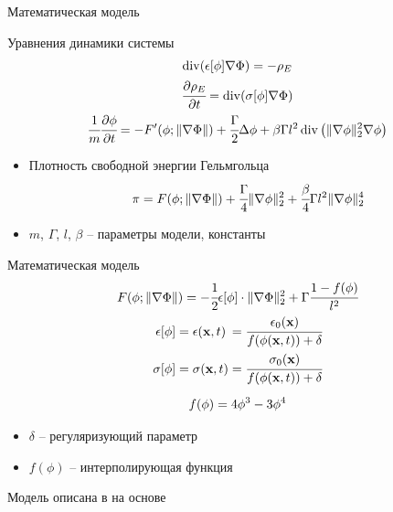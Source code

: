 \begin{frame}{Математическая модель}
\begin{block}{Уравнения динамики системы}
	\vspace{-2mm}
	\begin{gather*}
		\operatorname{{div}}(\epsilon[\phi] \nabla \Phi) = -\rho_E \\
		\cfrac{\partial \rho_E}{\partial t} = \operatorname{{div}}(\sigma[\phi] \nabla \Phi) \\
		\cfrac{1}{m} \cfrac{\partial \phi}{\partial t} = -F'( \phi; \| \nabla \Phi \|) + \cfrac{\Gamma}{2} \Delta \phi + \beta \Gamma l^2 \operatorname{{div}} \left( \| \nabla \phi \|_2^2 \nabla \phi \right)
	\end{gather*}
	\vspace{-4mm}
\end{block}
\begin{itemize}
	\item Плотность свободной энергии Гельмгольца
	\vspace{-0.2cm}
	\[
		\pi = F(\phi; \| \nabla \Phi \|) + \cfrac{\Gamma}{4} \| \nabla \phi \|_2^2 + \cfrac{\beta}{4} \Gamma l^2 \| \nabla \phi \|_2^4
	\]
	\item $m$, $\Gamma$, $l$, $\beta$ -- параметры модели, константы
\end{itemize}
\end{frame}


\begin{frame}{Математическая модель}
\vspace{-3mm}
\begin{gather*}
	F(\phi; \| \nabla \Phi \|) = -\cfrac{1}{2} \epsilon[\phi] \cdot \| \nabla \Phi \|_2^2 + \Gamma \cfrac{1 - f(\phi)}{l^2} \\
	\begin{alignedat}{3}
		\epsilon[\phi] &= \epsilon({\textbf{x}}, t) &&= \cfrac{\epsilon_0({\textbf{x}})}{f(\phi({\textbf{x}}, t)) + \delta} \\
		\sigma[\phi] &= \sigma({\textbf{x}}, t) &&= \cfrac{\sigma_0({\textbf{x}})}{f(\phi({\textbf{x}}, t)) + \delta}
	\end{alignedat} \\[2mm]
	f(\phi) = 4 \phi^3 - 3 \phi^4
\end{gather*}
\vspace{-6mm}
\begin{itemize}
	\item $\delta$ -- регуляризующий параметр
	\item $f(\phi)$ -- интерполирующая функция
\end{itemize}
\vspace{1mm}
\parind Модель описана в \cite{zipunova_computational} на основе \cite{pitike_dielectric_breakdown}
\end{frame}


